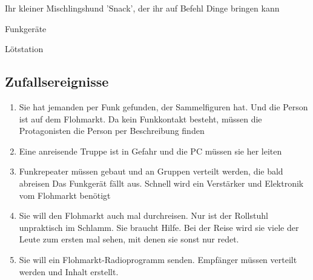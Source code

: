 \begin{npcBox}[title=Antigone]
    \begin{stressSection}
    \end{stressSection}
    \begin{tabularx}{\textwidth}{ XX }
    \end{tabularx}

    \begin{consequences}
    \item {}
    \item {}
    \item {}
    \end{consequences}

    \begin{equipment}
    \item Ihr kleiner Mischlingshund 'Snack', der ihr auf Befehl Dinge bringen kann
    \item Funkgeräte
    \item Lötstation
    \end{equipment}
\end{npcBox}

\subsection{Zufallsereignisse}

\begin{enumerate}
\item Sie hat jemanden per Funk gefunden, der Sammelfiguren hat. Und die Person ist auf dem Flohmarkt. Da kein Funkkontakt besteht, müssen die Protagonisten die Person per Beschreibung finden
\item Eine anreisende Truppe ist in Gefahr und die PC müssen sie her leiten
\item Funkrepeater müssen gebaut und an Gruppen verteilt werden, die bald abreisen
Das Funkgerät fällt aus. Schnell wird ein Verstärker und Elektronik vom Flohmarkt benötigt
\item Sie will den Flohmarkt auch mal durchreisen. Nur ist der Rollstuhl unpraktisch im Schlamm. Sie braucht Hilfe. Bei der Reise wird sie viele der Leute zum ersten mal sehen, mit denen sie sonst nur redet.
\item Sie will ein Flohmarkt-Radioprogramm senden. Empfänger müssen verteilt werden und Inhalt erstellt.
\end{enumerate}

\newpage

